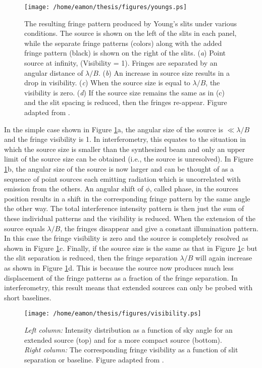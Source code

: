 \begin{figure}[t!]
\centering 
          \texttt{[image: /home/eamon/thesis/figures/youngs.ps]}
\caption[Fringe pattern produced by Young's slits]{The resulting fringe pattern produced by Young's slits under various conditions. The source is shown on the left of the slits in each panel, while the separate fringe patterns (colors) along with the added fringe pattern (black) is shown on the right of the slits. (\textit{a}) Point source at infinity, (Visibility = 1). Fringes are separated by an angular distance of $\lambda /B$. (\textit{b}) An increase in source size results in a drop in visibility. (\textit{c}) When the source size is equal to $\lambda /B$, the visibility is zero. (\textit{d}) If the source size remains the same as in (c) and the slit spacing is reduced, then the fringes re-appear. Figure adapted from \cite{jackson_2008}.}
\label{fig2.4}
\end{figure}

In the simple case shown in Figure \ref{fig2.4}a, the angular size of the source is  $\ll \lambda/B$ and the fringe visibility is 1. In interferometry, this equates to the situation in which the source size is smaller than the synthesized beam and only an upper limit of the source size can be obtained (i.e., the source is unresolved). In Figure \ref{fig2.4}b, the angular size of the source is now larger and can be thought of as a sequence of point sources each emitting radiation which is uncorrelated with emission from the others. An angular shift of $\phi$, called phase, in the sources position results in a shift in the corresponding fringe pattern by the same angle the other way. The total interference intensity pattern is then just the sum of these individual patterns and the visibility is reduced. When the extension of the source equals $\lambda/B$, the fringes disappear and give a constant illumination pattern. In this case the fringe visibility is zero and the source is completely resolved as shown in Figure \ref{fig2.4}c. Finally, if the source size is the same as that in Figure \ref{fig2.4}c but the slit separation is reduced, then the fringe separation $\lambda/B$ will again increase as shown in Figure \ref{fig2.4}d. This is because the source now produces much less displacement of the fringe patterns as a fraction of the fringe separation. In interferometry, this result means that extended sources can only be probed with short baselines. 

\begin{figure}[t!]
\centering 
          \texttt{[image: /home/eamon/thesis/figures/visibility.ps]}
\caption[Visibilities for various source sizes]{\textit{Left column:} Intensity distribution as a function of sky angle for an extended source (top) and for a more compact source (bottom). \textit{Right column:} The corresponding fringe visibility as a function of slit separation or baseline. Figure adapted from \cite{jackson_2008}.}
\label{fig2.5}
\end{figure}

